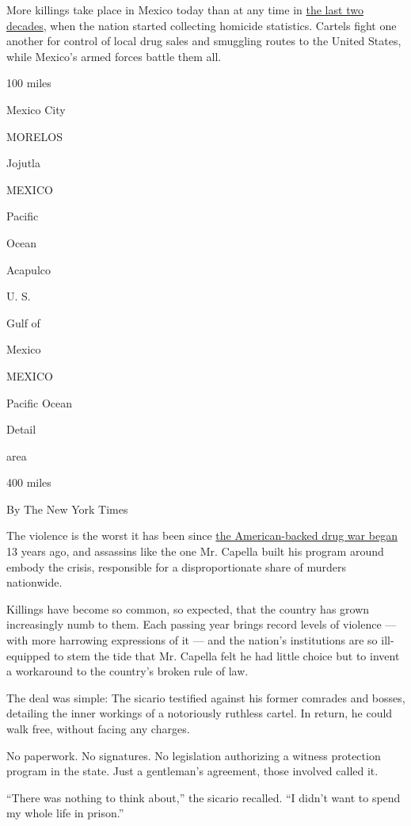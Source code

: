 More killings take place in Mexico today than at any time in
\href{https://www.nytimes.com/2017/08/04/world/americas/mexicos-drug-killings.html}{the
last two decades}, when the nation started collecting homicide
statistics. Cartels fight one another for control of local drug sales
and smuggling routes to the United States, while Mexico's armed forces
battle them all.

100 miles

Mexico City

MORELOS

Jojutla

MEXICO

Pacific

Ocean

Acapulco

U. S.

Gulf of

Mexico

MEXICO

Pacific Ocean

Detail

area

400 miles

By The New York Times

The violence is the worst it has been since
\href{https://www.nytimes.com/2019/12/11/world/americas/mexico-garcia-luna-indictment.html}{the
American-backed drug war began} 13 years ago, and assassins like the one
Mr. Capella built his program around embody the crisis, responsible for
a disproportionate share of murders nationwide.

Killings have become so common, so expected, that the country has grown
increasingly numb to them. Each passing year brings record levels of
violence --- with more harrowing expressions of it --- and the nation's
institutions are so ill-equipped to stem the tide that Mr. Capella felt
he had little choice but to invent a workaround to the country's broken
rule of law.

The deal was simple: The sicario testified against his former comrades
and bosses, detailing the inner workings of a notoriously ruthless
cartel. In return, he could walk free, without facing any charges.

No paperwork. No signatures. No legislation authorizing a witness
protection program in the state. Just a gentleman's agreement, those
involved called it.

``There was nothing to think about,'' the sicario recalled. ``I didn't
want to spend my whole life in prison.''

